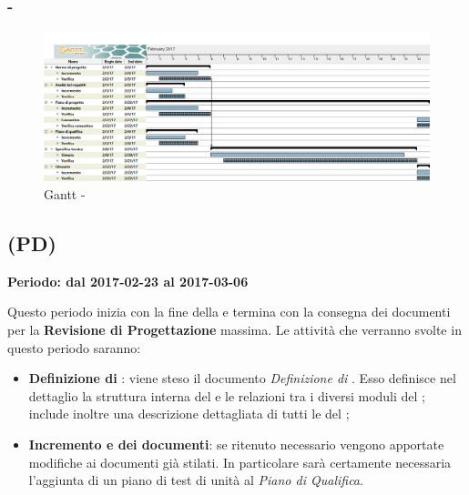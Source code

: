 \documentclass[./PianoDiProgetto.tex]{subfiles}
\begin{document}
  \newpage

  \subsubsection{ - \PerPA}
    \begin{figure}[!h]
    \centering
    \includegraphics[width=\textwidth]{images/PA}
    \caption{Gantt - \PerPA}
    \end{figure}


  \subsection{\PerPD{} (PD)}
  \textbf{Periodo: dal 2017-02-23 al 2017-03-06}

  Questo periodo inizia con la fine della \PerPA{} e termina con la consegna dei documenti per la \textbf{Revisione di Progettazione} massima. Le attività che verranno svolte in questo periodo saranno:
  \begin{itemize}
    \item \textbf{Definizione di }: viene steso il documento \textit{Definizione di }. Esso definisce nel dettaglio la struttura interna del  e le relazioni tra i diversi moduli del ; include inoltre una descrizione dettagliata di tutti le  del ;
    \item \textbf{Incremento e  dei documenti}: se ritenuto necessario vengono apportate modifiche ai documenti già stilati. In particolare sarà certamente necessaria l'aggiunta di un piano di test di unità al \textit{Piano di Qualifica}.
  \end{itemize}
\newpage
\end{document}
